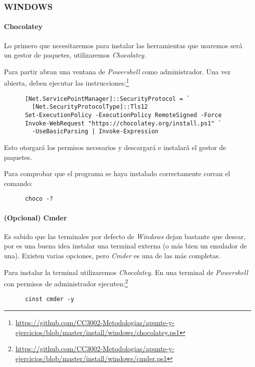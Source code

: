\subsubsection{WINDOWS}
  \paragraph{Chocolatey}
    Lo primero que necesitaremos para instalar las herramientas que usaremos será un gestor de 
    paquetes, utilizaremos \textit{Chocolatey}.\autocite{choco}

    Para partir abran una ventana de \textit{Powershell} como administrador.
    Una vez abierta, deben ejecutar las instrucciones:\footnote{
      \url{https://github.com/CC3002-Metodologias/apunte-y-ejercicios/blob/master/install/windows/chocolatey.ps1}
    }
    \begin{verbatim}
      [Net.ServicePointManager]::SecurityProtocol = `
        [Net.SecurityProtocolType]::Tls12
      Set-ExecutionPolicy -ExecutionPolicy RemoteSigned -Force
      Invoke-WebRequest "https://chocolatey.org/install.ps1" `
        -UseBasicParsing | Invoke-Expression
    \end{verbatim}

    Esto otorgará los permisos necesarios y descargará e instalará el gestor de paquetes.

    Para comprobar que el programa se haya instalado correctamente corran el comando:
    \begin{verbatim}
      choco -?
    \end{verbatim}

  \paragraph{(Opcional) Cmder}
    Es sabido que las terminales por defecto de \textit{Windows} dejan bastante que desear, 
    por es una buena idea instalar una terminal externa (o más bien un emulador de una).
    Existen varias opciones, pero \textit{Cmder} es una de las más completas.

    Para instalar la terminal utilizaremos \textit{Chocolatey}.
    En una terminal de \textit{Powershell} con permisos de administrador ejecuten:\footnote{
      \url{https://github.com/CC3002-Metodologias/apunte-y-ejercicios/blob/master/install/windows/cmder.ps1}
    }

    \begin{verbatim}
      cinst cmder -y
    \end{verbatim}

